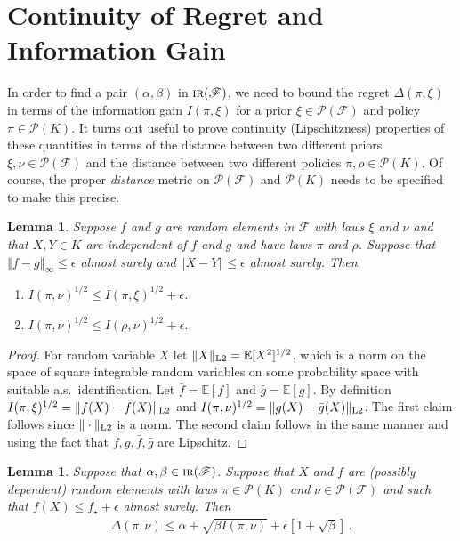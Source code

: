 \documentclass[letter, 12pt]{report}
\newcommand{\norm}[1]{\left \Vert  #1 \right \Vert}
\newcommand{\Lsnorm}[1]{ \Vert  #1 \Vert_{\text{\scriptsize \textrm{L2}}}}
\newcommand{\E}{\mathbb E}
\newcommand{\sF}{\mathscr F}
\newcommand{\sP}{\mathscr P}
\newcommand{\1}{\mathbf{1}}
\newcommand{\IR}{\operatorname{\textsc{ir}}}
\theoremstyle{plain}
\newtheorem{lemma}[theorem]{Lemma}
\theoremstyle{definition}
\theoremstyle{remark}
\begin{document}
\section{Continuity of Regret and Information Gain}
In order to find a pair $(\alpha, \beta)$ in $\IR(\sF)$, we need to bound the regret $\Delta(\pi, \xi)$
in terms of the information gain $I(\pi, \xi)$ for a prior $\xi \in \sP(\sF)$ and policy $\pi \in \sP(K)$.
It turns out useful to prove continuity (Lipschitzness) properties of these quantities
in terms of the distance between two different priors $\xi, \nu \in \sP(\sF)$ and the distance between two different policies $\pi, \rho \in \sP(K)$.
Of course, the proper \textit{distance} metric on $\sP(\sF)$ and $\sP(K)$ needs to be specified to make this precise.
\begin{lemma}\label{lem:cont:I}
    Suppose $f$ and $g$ are random elements in $\sF$ with laws $\xi$ and $\nu$
    and that $X, Y \in K$ are independent of $f$ and $g$ and have laws $\pi$ and $\rho$.
    Suppose that
    $\norm{f - g}_\infty \leq \epsilon$ almost surely and $\norm{X - Y} \leq \epsilon$ almost surely.
    Then
    \begin{enumerate}
        \item $I(\pi, \nu)^{1/2} \leq I(\pi, \xi)^{1/2} + \epsilon$.
        \item $I(\pi, \nu)^{1/2} \leq I(\rho, \nu)^{1/2} + \epsilon$.
    \end{enumerate}
\end{lemma}

\begin{proof}
    For random variable $X$ let $\Lsnorm{X} = \E[X^2]^{1/2}$, which is a norm
    on the space of square integrable random variables on some probability space with suitable a.s.\ identification.
    Let $\bar f = \E[f]$ and $\bar g = \E[g]$.
    By definition $I(\pi, \xi)^{1/2} = \Lsnorm{f(X) - \bar f(X)}$ and $I(\pi, \nu)^{1/2} = \Lsnorm{g(X) - \bar g(X)}$.
    The first claim follows since $\Lsnorm{\cdot}$ is a norm.
    The second claim follows in the same manner and using the fact that $f, g, \bar f, \bar g$ are Lipschitz.
\end{proof}


\begin{lemma}\label{lem:ts-eps}
    Suppose that $\alpha, \beta \in \IR(\sF)$.
    Suppose that $X$ and $f$ are (possibly dependent) random elements with laws $\pi \in \sP(K)$ and $\nu \in \sP(\sF)$ and such that
    $f(X) \leq f_\star + \epsilon$ almost surely. Then
    \begin{align*}
        \Delta(\pi, \nu) \leq \alpha + \sqrt{\beta I(\pi, \nu)} + \epsilon\left[1 + \sqrt{\beta}\right]\,.
    \end{align*}
\end{lemma}
\end{document}
